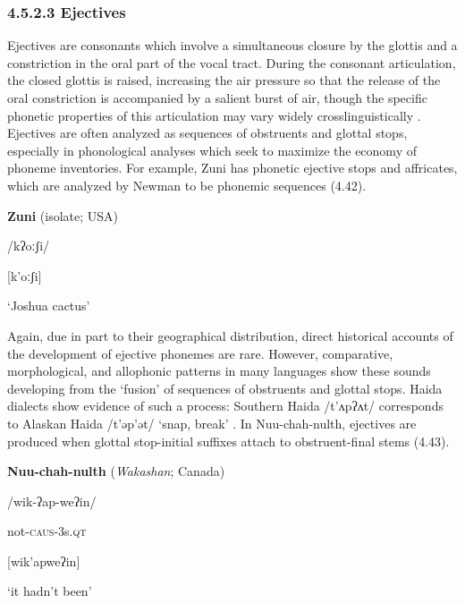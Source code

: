 \subsubsection{\rmfamily\bfseries} 
\subsubsection{\textbf{4.5.2.3} \textbf{Ejectives} }

  Ejectives are consonants which involve a simultaneous closure by the glottis and a constriction in the oral part of the vocal tract. During the consonant articulation, the closed glottis is raised, increasing the air pressure so that the release of the oral constriction is accompanied by a salient burst of air, though the specific phonetic properties of this articulation may vary widely crosslinguistically \citep{Lindau1984}. Ejectives are often analyzed as sequences of obstruents and glottal stops, especially in phonological analyses which seek to maximize the economy of phoneme inventories. For example, Zuni has phonetic ejective stops and affricates, which are analyzed by Newman to be phonemic sequences (4.42).

\ea\label{ex:(4.42)}
  \textbf{Zuni} (isolate; USA)

/kʔoːʃi/

[k’oːʃi]

‘Joshua cactus’

\citep[16]{Newman1965}

\z

  Again, due in part to their geographical distribution, direct historical accounts of the development of ejective phonemes are rare. However, comparative, morphological, and allophonic patterns in many languages show these sounds developing from the ‘fusion’ of sequences of obstruents and glottal stops. Haida dialects show evidence of such a process: Southern Haida /t’ʌpʔʌt/ corresponds to Alaskan Haida /t’əp’ət/ ‘snap, break’ \citep[312]{Fallon2002}. In Nuu-chah-nulth, ejectives are produced when glottal stop-initial suffixes attach to obstruent-final stems (4.43).

\ea\label{ex:(4.43)}
  \textbf{Nuu-chah-nulth} (\textit{Wakashan}; Canada)

/wik-ʔap-weʔin/

not-\textsc{caus}-3s.\textsc{qt}

[wik’apweʔin]

‘it hadn’t been’

\citep[69]{Stonham1999}
\z

